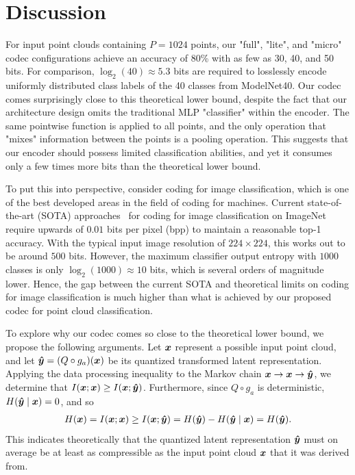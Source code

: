 \FloatBarrier




\section{Discussion}
\label{sec:discussion}

For input point clouds containing $P = 1024$ points, our "full", "lite", and "micro" codec configurations achieve an accuracy of 80\% with as few as 30, 40, and 50 bits.
For comparison, $\log_2(40) \approx 5.3$ bits are required to losslessly encode uniformly distributed class labels of the 40 classes from ModelNet40.
Our codec comes surprisingly close to this theoretical lower bound, despite the fact that our architecture design omits the traditional MLP "classifier" within the encoder.
The same pointwise function is applied to all points, and the only operation that "mixes" information between the points is a pooling operation.
This suggests that our encoder should possess limited classification abilities, and yet it consumes only a few times more bits than the theoretical lower bound.

To put this into perspective, consider coding for image classification, which is one of the best developed areas in the field of coding for machines.
Current state-of-the-art (SOTA) approaches~\cite{matsubara2022wacv,duan2022pcs,Ahuja_2023_CVPR} for coding for image classification on ImageNet~\cite{ImageNet} require upwards of $0.01$ bits per pixel (bpp) to maintain a reasonable top-1 accuracy.
With the typical input image resolution of $224 \times 224$, this works out to be around $500$ bits.
However, the maximum classifier output entropy with $1000$ classes is only $\log_2(1000) \approx 10$ bits, which is several orders of magnitude lower.
Hence, the gap between the current SOTA and theoretical limits on coding for image classification is much higher than what is achieved by our proposed codec for point cloud classification.

To explore why our codec comes so close to the theoretical lower bound, we propose the following arguments.
Let ${\boldsymbol{x}}$ represent a possible input point cloud, and
let ${\boldsymbol{\hat{y}}} = (Q \circ g_a)({\boldsymbol{x}})$ be its quantized transformed latent representation.
Applying the data processing inequality to the Markov chain
${\boldsymbol{x}} \to {\boldsymbol{x}} \to {\boldsymbol{\hat{y}}}$,
we determine that
$I({\boldsymbol{x}}; {\boldsymbol{x}}) \geq I({\boldsymbol{x}}; {\boldsymbol{\hat{y}}})$.
Furthermore, since $Q \circ g_a$ is deterministic,
$H({\boldsymbol{\hat{y}}} \mid {\boldsymbol{x}}) = 0$, and so
\begin{align*}
  H({\boldsymbol{x}})
  = I({\boldsymbol{x}}; {\boldsymbol{x}})
  \geq I({\boldsymbol{x}}; {\boldsymbol{\hat{y}}})
  = H({\boldsymbol{\hat{y}}}) - H({\boldsymbol{\hat{y}}} \mid {\boldsymbol{x}})
  = H({\boldsymbol{\hat{y}}}).
\end{align*}
This indicates theoretically that the quantized latent representation ${\boldsymbol{\hat{y}}}$ must on average be at least as compressible as the input point cloud ${\boldsymbol{x}}$ that it was derived from.

